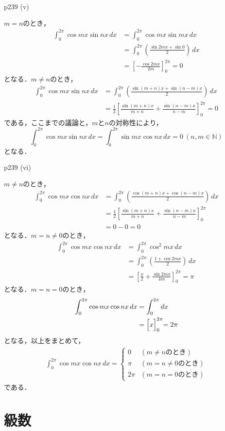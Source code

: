 \documentclass[dvipdfmx,uplatex,11pt]{jsarticle}
\begin{document}
	\begin{screen}
		p239 (v) \par 
		$m=n$のとき，
		\begin{align*}
			\int_{0}^{2\pi} \cos m x \sin nx \, dx & = \int_{0}^{2\pi} \cos mx \sin mx \, dx \\
			& = \int_{0}^{2\pi} \left (\frac{\sin 2mx + \sin 0}{2}\right ) \, dx \\
			& = \left [-\frac{\cos 2mx}{2m}\right ]_{0}^{2\pi} =0
		\end{align*}
		となる．$m \ne n$のとき，
		\begin{align*}
			\int_{0}^{2\pi} \cos mx \sin nx \, dx & = \int_{0}^{2\pi} \left (\frac{\sin (m+n)x + \sin (n-m)x}{2}\right) \, dx \\
			& = \frac{1}{2}\left [\frac{\sin (m+n)x}{m+n}+\frac{\sin (n-m)x}{n-m} \right]_{0}^{2\pi} =0
		\end{align*}
		である，ここまでの議論と，$m$と$n$の対称性により，
			\[
				\int_{0}^{2\pi} \cos mx \sin nx \, dx =\int_{0}^{2\pi} \sin mx \cos nx \, dx =0 ~(n,m \in \mathbb{N})
			\]
		となる．
	\end{screen}

	\begin{screen}
		p239 (vi) \par 
		$m \ne n$のとき，
		\begin{align*}
			\int_{0}^{2\pi} \cos mx \cos nx \, dx & = \int_{0}^{2\pi} \left (\frac{\cos(m+n)x+\cos(n-m)x}{2}\right) \, dx\\
			& = \frac{1}{2} \left [\frac{\sin (m+n)x}{m+n}+\frac{\sin(n-m)x}{n-m}\right]_{0}^{2\pi} \\
			& = 0-0 =0
		\end{align*}
		となる．$m =n \ne 0$のとき，
		\begin{align*}
			\int_{0}^{2\pi} \cos mx \cos nx \, dx & = \int_{0}^{2\pi} \cos^2 mx \, dx \\
			& = \int_{0}^{2\pi} \left (\frac{1+\cos 2mx}{2}\right) \, dx  \\
			& = \left [\frac{x}{2}+\frac{\sin 2mx}{4m}\right]_{0}^{2\pi} = \pi
		\end{align*}
		となる．$m =n =0$のとき，
		\begin{align*}
			\int_{0}^{2\pi} \cos mx \cos nx \, dx & = \int_{0}^{2\pi} dx \\
			& = \Bigl[x\Bigl]_{0}^{2\pi} = 2\pi
		\end{align*}
		となる，以上をまとめて，
		\begin{align*}
			\int_{0}^{2\pi} \cos mx \cos nx \, dx =
			\begin{cases}
				0 & (m \ne n のとき)\\
				\pi & (m = n\ne 0のとき)\\
				2 \pi & (m=n=0 のとき)
			\end{cases}
		\end{align*}
		である．
	\end{screen}

\newpage

\section{級数}
\end{document}
